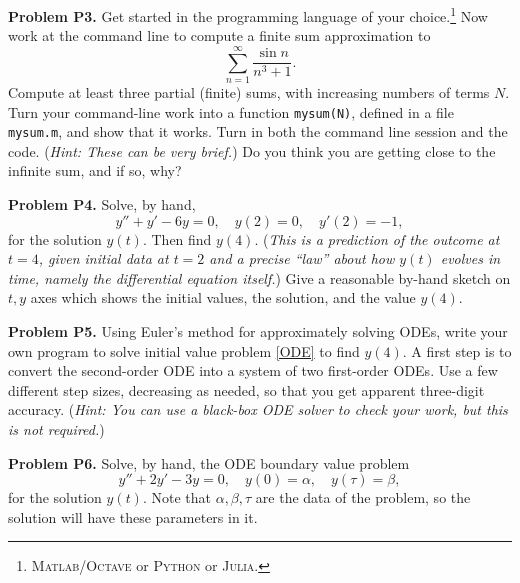 \documentclass[12pt]{amsart}
\newcommand{\Julia}{\textsc{Julia}\xspace}
\newcommand{\Matlab}{\textsc{Matlab}\xspace}
\newcommand{\Octave}{\textsc{Octave}\xspace}
\newcommand{\Python}{\textsc{Python}\xspace}
\newcommand{\prob}[1]{\bigskip\noindent\textbf{#1}\quad }
\begin{document}
\prob{Problem P3.}  Get started in the programming language of your choice.\footnote{\Matlab/\Octave or \Python or \Julia.}  Now work at the command line to compute a finite sum approximation to
	$$\sum_{n=1}^\infty \frac{\sin n}{n^3+1}.$$
Compute at least three partial (finite) sums, with increasing numbers of terms $N$.  Turn your command-line work into a function \texttt{mysum(N)}, defined in a file  \texttt{mysum.m}, and show that it works.  Turn in both the command line session and the code.  (\emph{Hint:  These can be very brief.})  Do you think you are getting close to the infinite sum, and if so, why?

\prob{Problem P4.}  Solve, by hand,
\begin{equation}\label{ODE}
y'' + y' - 6 y = 0, \quad y(2)=0, \quad y'(2)=-1,
\end{equation}
for the solution $y(t)$.  Then find $y(4)$.  (\emph{This is a \emph{prediction} of the outcome at $t=4$, given initial data at $t=2$ and a precise ``law'' about how $y(t)$ evolves in time, namely the differential equation itself.})  Give a reasonable by-hand sketch on $t,y$ axes which shows the initial values, the solution, and the value $y(4)$.  

\prob{Problem P5.}  Using Euler's method for approximately solving ODEs, write your own program to solve initial value problem \eqref{ODE} to find $y(4)$.  A first step is to convert the second-order ODE into a system of two first-order ODEs.  Use a few different step sizes, decreasing as needed, so that you get apparent three-digit accuracy.  (\emph{Hint:  You can use a black-box ODE solver to \emph{check} your work, but this is not required.})

\prob{Problem P6.}  Solve, by hand, the ODE boundary value problem
\begin{equation}\label{ODEBVP}
y'' + 2 y' - 3 y = 0, \quad y(0)=\alpha, \quad y(\tau)=\beta,
\end{equation}
for the solution $y(t)$.  Note that $\alpha,\beta,\tau$ are the data of the problem, so the solution will have these parameters in it.
\end{document}
